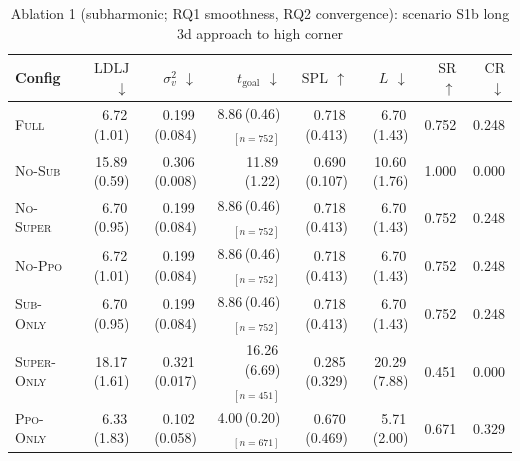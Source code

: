 \begin{table}[h]
\centering
\small
\caption{Ablation 1 (subharmonic; RQ1 smoothness, RQ2 convergence): scenario S1b long 3d approach to high corner}
\label{tab:abl1:S1b_long_3d_approach_to_high_corner}
\begin{tabular}{lrrrrrrr}
\toprule
Config & $\mathrm{LDLJ}$ $\downarrow$ & $\sigma^2_v$ $\downarrow$ & $t_{\mathrm{goal}}$ $\downarrow$ & $\mathrm{SPL}$ $\uparrow$ & $L$ $\downarrow$ & $\mathrm{SR}$ $\uparrow$ & $\mathrm{CR}$ $\downarrow$ \\
\midrule
\textsc{Full} & 6.72\,(1.01) & 0.199\,(0.084) & 8.86\,(0.46)$_{[n=752]}$ & 0.718\,(0.413) & 6.70\,(1.43) & 0.752 & 0.248 \\
\textsc{No-Sub} & 15.89\,(0.59) & 0.306\,(0.008) & 11.89\,(1.22) & 0.690\,(0.107) & 10.60\,(1.76) & 1.000 & 0.000 \\
\textsc{No-Super} & 6.70\,(0.95) & 0.199\,(0.084) & 8.86\,(0.46)$_{[n=752]}$ & 0.718\,(0.413) & 6.70\,(1.43) & 0.752 & 0.248 \\
\textsc{No-Ppo} & 6.72\,(1.01) & 0.199\,(0.084) & 8.86\,(0.46)$_{[n=752]}$ & 0.718\,(0.413) & 6.70\,(1.43) & 0.752 & 0.248 \\
\textsc{Sub-Only} & 6.70\,(0.95) & 0.199\,(0.084) & 8.86\,(0.46)$_{[n=752]}$ & 0.718\,(0.413) & 6.70\,(1.43) & 0.752 & 0.248 \\
\textsc{Super-Only} & 18.17\,(1.61) & 0.321\,(0.017) & 16.26\,(6.69)$_{[n=451]}$ & 0.285\,(0.329) & 20.29\,(7.88) & 0.451 & 0.000 \\
\textsc{Ppo-Only} & 6.33\,(1.83) & 0.102\,(0.058) & 4.00\,(0.20)$_{[n=671]}$ & 0.670\,(0.469) & 5.71\,(2.00) & 0.671 & 0.329 \\
\bottomrule
\end{tabular}
\end{table}

